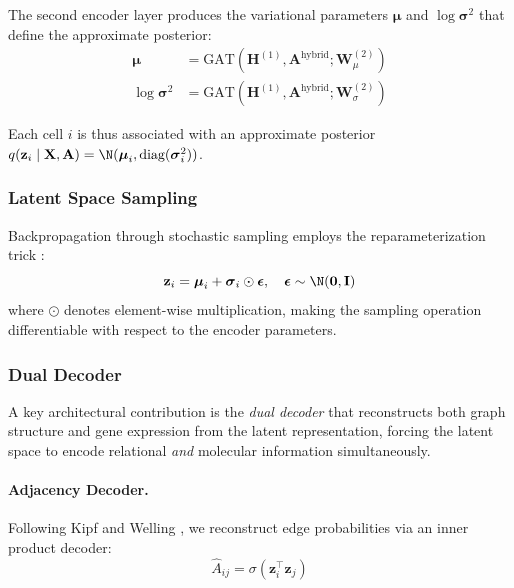 \documentclass{article}
\newcommand{\sigmoid}{\sigma}
\begin{document}
The second encoder layer produces the variational parameters $\boldsymbol{\mu}$ and $\log \boldsymbol{\sigma}^2$ that define the approximate posterior:
\begin{align}
    \boldsymbol{\mu} &= \text{GAT}(\mathbf{H}^{(1)}, \mathbf{A}^{\text{hybrid}}; \mathbf{W}^{(2)}_\mu) \label{eq:mu} \\
    \log \boldsymbol{\sigma}^2 &= \text{GAT}(\mathbf{H}^{(1)}, \mathbf{A}^{\text{hybrid}}; \mathbf{W}^{(2)}_\sigma) \label{eq:sigma}
\end{align}

Each cell $i$ is thus associated with an approximate posterior $q(\mathbf{z}_i \mid \mathbf{X}, \mathbf{A}) = \N(\boldsymbol{\mu}_i, \text{diag}(\boldsymbol{\sigma}_i^2))$.

\subsubsection{Latent Space Sampling}

Backpropagation through stochastic sampling employs the reparameterization trick \cite{kingma2013auto}:
\begin{equation}
    \mathbf{z}_i = \boldsymbol{\mu}_i + \boldsymbol{\sigma}_i \odot \boldsymbol{\epsilon}, \quad \boldsymbol{\epsilon} \sim \N(\mathbf{0}, \mathbf{I})
    \label{eq:reparam}
\end{equation}
where $\odot$ denotes element-wise multiplication, making the sampling operation differentiable with respect to the encoder parameters.

\subsubsection{Dual Decoder}
\label{sec:dual_decoder}

A key architectural contribution is the \textit{dual decoder} that reconstructs both graph structure and gene expression from the latent representation, forcing the latent space to encode relational \textit{and} molecular information simultaneously.

\paragraph{Adjacency Decoder.} Following Kipf and Welling \cite{kipf2016variational}, we reconstruct edge probabilities via an inner product decoder:
\begin{equation}
    \hat{A}_{ij} = \sigmoid(\mathbf{z}_i^\top \mathbf{z}_j)
    \label{eq:adj_decoder}
\end{equation}
\end{document}
